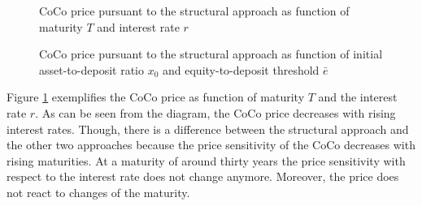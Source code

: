 \begin{figure}[H]
\centering
    \caption[CoCo price pursuant to the structural approach as function of maturity and interest rate]{CoCo price pursuant to the structural approach as function of maturity $T$ and interest rate $r$}
  \label{fig:sa2}
  \end{figure}

\begin{figure}[H]
\centering
    \caption[CoCo price pursuant to the structural approach as function of asset-to-deposit ratio and equity-to-deposit threshold]{CoCo price pursuant to the structural approach as function of initial asset-to-deposit ratio $x_0$ and equity-to-deposit threshold $\bar{e}$}
  \label{fig:sa3}
  \end{figure}

Figure \ref{fig:sa2} exemplifies the CoCo price as function of maturity $T$ and the interest rate $r$. As can be seen from the diagram, the CoCo price decreases with rising interest rates. Though, there is a difference between the structural approach and the other two approaches because the price sensitivity of the CoCo decreases with rising maturities. At a maturity of around thirty years the price sensitivity with respect to the interest rate does not change anymore. Moreover, the price does not react to changes of the maturity.\\

